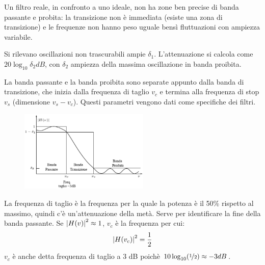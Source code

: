 Un filtro reale, in confronto a uno ideale, non ha zone ben precise di banda passante e probita: la transizione non è immediata (esiste una zona di transizione) e le frequenze non hanno peso uguale bensì fluttuazioni con ampiezza variabile. 

Si rilevano oscillazioni non trascurabili ampie $\delta_1$. L'attenuazione si calcola come $20\log_{10} \delta_2 dB$, con $\delta_2$ ampiezza della massima oscillazione in banda proibita. 

La banda passante e la banda proibita sono separate appunto dalla banda di transizione, che inizia dalla frequenza di taglio $v_c$ e termina alla frequenza di stop $v_s$ (dimensione $v_s - v_c$). Questi parametri vengono dati come specifiche dei filtri. 

\begin{figure}
	\vspace{-15pt}
	\includegraphics[width=0.55\textwidth]{Lezioni/Immagini/taglio}
	\vspace{-50pt}
\end{figure}

La frequenza di taglio è la frequenza per la quale la potenza è il 50\% rispetto al massimo, quindi c'è un'attenuazione della metà. Serve per identificare la fine della banda passante. Se $\left|H(v)\right|^2 \approx 1$, $v_c$ è la frequenza per cui:
$$\left|H(v_c)\right|^2 = \frac{1}{2}$$
$v_c$ è anche detta frequenza di taglio a 3 dB poichè $10\log_{10}(\nicefrac{1}{2}) \approx -3 dB$.
\bigskip
\bigskip
